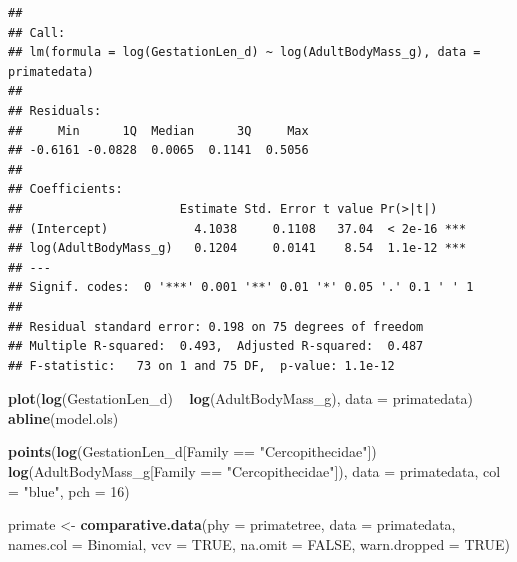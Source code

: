 \documentclass[]{article}
\newenvironment{Shaded}{\begin{snugshade}}{\end{snugshade}}
\newcommand{\KeywordTok}[1]{\textcolor[rgb]{0.13,0.29,0.53}{\textbf{{#1}}}}
\newcommand{\DataTypeTok}[1]{\textcolor[rgb]{0.13,0.29,0.53}{{#1}}}
\newcommand{\DecValTok}[1]{\textcolor[rgb]{0.00,0.00,0.81}{{#1}}}
\newcommand{\StringTok}[1]{\textcolor[rgb]{0.31,0.60,0.02}{{#1}}}
\newcommand{\OtherTok}[1]{\textcolor[rgb]{0.56,0.35,0.01}{{#1}}}
\newcommand{\NormalTok}[1]{{#1}}
\begin{document}
\begin{verbatim}
## 
## Call:
## lm(formula = log(GestationLen_d) ~ log(AdultBodyMass_g), data = primatedata)
## 
## Residuals:
##     Min      1Q  Median      3Q     Max 
## -0.6161 -0.0828  0.0065  0.1141  0.5056 
## 
## Coefficients:
##                      Estimate Std. Error t value Pr(>|t|)    
## (Intercept)            4.1038     0.1108   37.04  < 2e-16 ***
## log(AdultBodyMass_g)   0.1204     0.0141    8.54  1.1e-12 ***
## ---
## Signif. codes:  0 '***' 0.001 '**' 0.01 '*' 0.05 '.' 0.1 ' ' 1
## 
## Residual standard error: 0.198 on 75 degrees of freedom
## Multiple R-squared:  0.493,  Adjusted R-squared:  0.487 
## F-statistic:   73 on 1 and 75 DF,  p-value: 1.1e-12
\end{verbatim}

\begin{Shaded}
\begin{Highlighting}[]
\KeywordTok{plot}\NormalTok{(}\KeywordTok{log}\NormalTok{(GestationLen_d) ~}\StringTok{ }\KeywordTok{log}\NormalTok{(AdultBodyMass_g), }\DataTypeTok{data =} \NormalTok{primatedata)}
\KeywordTok{abline}\NormalTok{(model.ols)}
\end{Highlighting}
\end{Shaded}

\begin{Shaded}
\begin{Highlighting}[]
\KeywordTok{points}\NormalTok{(}\KeywordTok{log}\NormalTok{(GestationLen_d[Family ==}\StringTok{ "Cercopithecidae"}\NormalTok{]) ~}\StringTok{ }\KeywordTok{log}\NormalTok{(AdultBodyMass_g[Family ==}\StringTok{ }
\StringTok{    "Cercopithecidae"}\NormalTok{]), }\DataTypeTok{data =} \NormalTok{primatedata, }\DataTypeTok{col =} \StringTok{"blue"}\NormalTok{, }\DataTypeTok{pch =} \DecValTok{16}\NormalTok{)}
\end{Highlighting}
\end{Shaded}

\begin{Shaded}
\begin{Highlighting}[]
\NormalTok{primate <-}\StringTok{ }\KeywordTok{comparative.data}\NormalTok{(}\DataTypeTok{phy =} \NormalTok{primatetree, }\DataTypeTok{data =} \NormalTok{primatedata, }\DataTypeTok{names.col =} \NormalTok{Binomial, }
    \DataTypeTok{vcv =} \OtherTok{TRUE}\NormalTok{, }\DataTypeTok{na.omit =} \OtherTok{FALSE}\NormalTok{, }\DataTypeTok{warn.dropped =} \OtherTok{TRUE}\NormalTok{)}
\end{Highlighting}
\end{Shaded}
\end{document}
